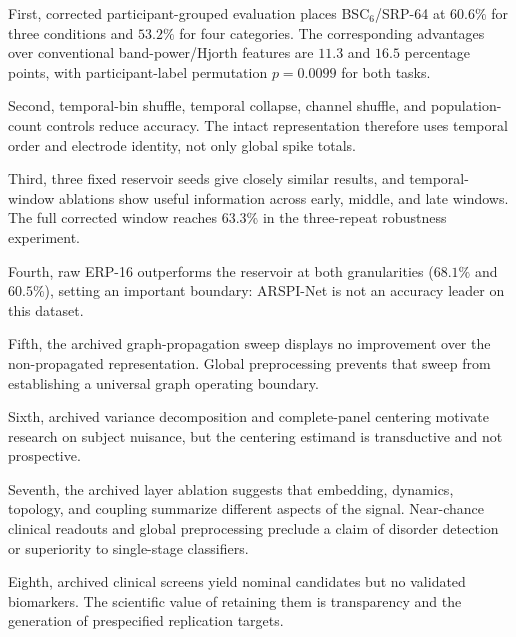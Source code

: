 First, corrected participant-grouped evaluation places BSC$_6$/SRP-64 at $60.6\%$ for three conditions and $53.2\%$ for four categories. The corresponding advantages over conventional band-power/Hjorth features are $11.3$ and $16.5$ percentage points, with participant-label permutation $p=0.0099$ for both tasks.

Second, temporal-bin shuffle, temporal collapse, channel shuffle, and population-count controls reduce accuracy. The intact representation therefore uses temporal order and electrode identity, not only global spike totals.

Third, three fixed reservoir seeds give closely similar results, and temporal-window ablations show useful information across early, middle, and late windows. The full corrected window reaches $63.3\%$ in the three-repeat robustness experiment.

Fourth, raw ERP-16 outperforms the reservoir at both granularities ($68.1\%$ and $60.5\%$), setting an important boundary: ARSPI-Net is not an accuracy leader on this dataset.

Fifth, the archived graph-propagation sweep displays no improvement over the non-propagated representation. Global preprocessing prevents that sweep from establishing a universal graph operating boundary.

Sixth, archived variance decomposition and complete-panel centering motivate research on subject nuisance, but the centering estimand is transductive and not prospective.

Seventh, the archived layer ablation suggests that embedding, dynamics, topology, and coupling summarize different aspects of the signal. Near-chance clinical readouts and global preprocessing preclude a claim of disorder detection or superiority to single-stage classifiers.

Eighth, archived clinical screens yield nominal candidates but no validated biomarkers. The scientific value of retaining them is transparency and the generation of prespecified replication targets.
